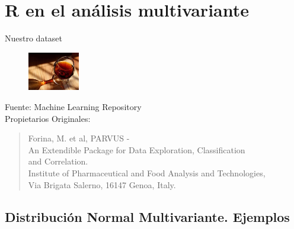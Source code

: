 \documentclass[xcolor=table]{beamer}
\begin{document}
\section{R en el análisis multivariante}
\begin{frame}{Nuestro dataset}

\begin{table}[]
\end{table}
\begin{figure}
\centering
\includegraphics[width=0.2\textwidth]{vino.jpg}
\end{figure}
{Fuente: Machine Learning Repository\\
Propietarios Originales: }\begin{quote}\scriptsize Forina, M. et al, PARVUS -\\
An Extendible Package for Data Exploration, Classification \\and Correlation.\\
Institute of Pharmaceutical and Food Analysis and Technologies, \\Via Brigata Salerno,
16147 Genoa, Italy.\end{quote}
\end{frame}


\subsection{Distribución Normal Multivariante. Ejemplos}
\end{document}
